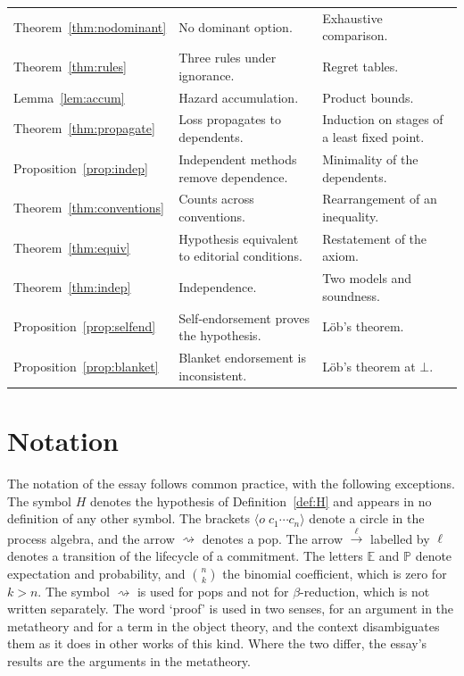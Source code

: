 \documentclass[11pt]{article}
\theoremstyle{plain}
\theoremstyle{definition}
\theoremstyle{remark}
\newcommand{\Hyp}{H}
\newcommand{\red}{\rightsquigarrow}
\newcommand{\cir}[2]{\langle #1\;#2\rangle}
\newcommand{\lto}[1]{\xrightarrow{\;#1\;}}
\begin{document}
\begin{longtable}{@{}p{}p{}p{}@{}}
Theorem~\ref{thm:nodominant} & No dominant option. & Exhaustive comparison. \\
Theorem~\ref{thm:rules} & Three rules under ignorance. & Regret tables. \\
Lemma~\ref{lem:accum} & Hazard accumulation. & Product bounds. \\
Theorem~\ref{thm:propagate} & Loss propagates to dependents. & Induction on stages of a least fixed point. \\
Proposition~\ref{prop:indep} & Independent methods remove dependence. & Minimality of the dependents. \\
Theorem~\ref{thm:conventions} & Counts across conventions. & Rearrangement of an inequality. \\
Theorem~\ref{thm:equiv} & Hypothesis equivalent to editorial conditions. & Restatement of the axiom. \\
Theorem~\ref{thm:indep} & Independence. & Two models and soundness. \\
Proposition~\ref{prop:selfend} & Self-endorsement proves the hypothesis. & L\"ob's theorem. \\
Proposition~\ref{prop:blanket} & Blanket endorsement is inconsistent. & L\"ob's theorem at $\bot$. \\
\bottomrule
\end{longtable}

\section{Notation}\label{app:notation}

The notation of the essay follows common practice, with the following exceptions. The symbol $\Hyp$ denotes the hypothesis of Definition~\ref{def:H} and appears in no definition of any other symbol. The brackets $\cir{o}{c_1\cdots c_n}$ denote a circle in the process algebra, and the arrow $\red$ denotes a pop. The arrow $\lto{\ell}$ labelled by $\ell$ denotes a transition of the lifecycle of a commitment. The letters $\mathbb E$ and $\mathbb P$ denote expectation and probability, and $\binom{n}{k}$ the binomial coefficient, which is zero for $k>n$. The symbol $\red$ is used for pops and not for $\beta$-reduction, which is not written separately. The word `proof' is used in two senses, for an argument in the metatheory and for a term in the object theory, and the context disambiguates them as it does in other works of this kind. Where the two differ, the essay's results are the arguments in the metatheory.
\end{document}
